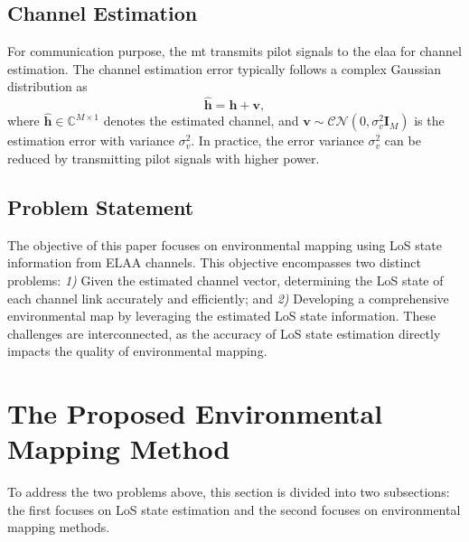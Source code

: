 \documentclass[conference, a4paper]{IEEEtran}
\begin{document}
\subsection{Channel Estimation}
For communication purpose, the \gls{mt} transmits pilot signals to the \gls{elaa} for channel estimation.
The channel estimation error typically follows a complex Gaussian distribution as \cite{Liu2024b}
\begin{equation} \label{eqn02440914}
	\widehat{\mathbf{h}} = \mathbf{h} + \mathbf{v},
\end{equation}
where $\widehat{\mathbf{h}}\in \mathbb{C}^{M \times 1}$ denotes the estimated channel, and $\mathbf{v} \sim \mathcal{CN}(0, \sigma_{v}^{2}\mathbf{I}_{M})$ is the estimation error with variance $\sigma_{v}^{2}$.
In practice, the error variance $\sigma_{v}^{2}$ can be reduced by transmitting pilot signals with higher power.

\subsection{Problem Statement} \label{sec1c}
The objective of this paper focuses on environmental mapping using LoS state information from ELAA channels.
This objective encompasses two distinct problems: \textit{1)} Given the estimated channel vector, determining the LoS state of each channel link accurately and efficiently; and \textit{2)} Developing a comprehensive environmental map by leveraging the estimated LoS state information.
These challenges are interconnected, as the accuracy of LoS state estimation directly impacts the quality of environmental mapping.

\section{The Proposed Environmental Mapping Method}
To address the two problems above, this section is divided into two subsections: the first focuses on LoS state estimation and the second focuses on environmental mapping methods.
\end{document}
